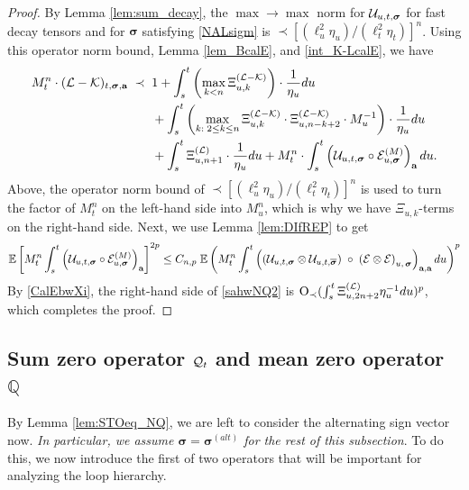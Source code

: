 \begin{proof}
By Lemma \ref{lem:sum_decay}, the $\max\to\max$ norm for ${\cal U}_{u,t,\boldsymbol{\sigma}}$ for fast decay tensors and for $\boldsymbol{\sigma}$ satisfying \eqref{NALsigm} is $\prec[(\ell_{u}^{2}\eta_{u})/(\ell_{t}^{2}\eta_{t})]^{n}$. Using this operator norm bound, Lemma \ref{lem_BcalE}, and \eqref{int_K-LcalE}, we have 
\begin{align}\label{sahwNQ}
M_{t}^n\cdot      (\mathcal{L} - \mathcal{K})_{t, \boldsymbol{\sigma}, \textbf{a}} \;\prec\; \; &
  1+   \int_{s}^t  \left( \max_{k<n }\Xi^{({\cal L-\cal K})}_{u,k}\right) \cdot \frac{1}{\eta_u}   du 
    \nonumber \\
    &+ \int_{s}^t \left( \max_{k:\;2\le k\le n }\Xi^{({\cal L-\cal K})}_{u,k}\cdot \Xi^{({\cal L-\cal K})}_{u,n-k+2}\cdot M_{u}^{-1}\right)\cdot \frac{1}{\eta_u} du 
    \nonumber \\
    &+ \int_{s}^t \Xi^{(\cal L)}_{u,n+1}\cdot \frac1{\eta_u} du 
   +
   M_{t}^n\cdot\int_{s}^t \left(\mathcal{U}_{u, t, \boldsymbol{\sigma}} \circ    \mathcal{E}^{(M)}_{u, \boldsymbol{\sigma}}\right)_{\textbf{a}} du.
\end{align}
 Above, the operator norm bound of $\prec[(\ell_{u}^{2}\eta_{u})/(\ell_{t}^{2}\eta_{t})]^{n}$ is used to turn the factor of $M_{t}^{n}$ on the left-hand side into $M_{u}^{n}$, which is why we have $\Xi_{u,k}$-terms on the right-hand side. Next, we use Lemma \ref{lem:DIfREP} to get
\begin{equation} \label{sahwNQ2}
   \mathbb{E} \left [   M_{t}^{n} \int_{s}^t \left(\mathcal{U}_{u, t, \boldsymbol{\sigma}} \circ \mathcal{E}^{(M)}_{u, \boldsymbol{\sigma}}\right)_{\textbf{a}} \right ]^{2p} 
   \le C_{n,p} \; 
   \mathbb{E}    \left(M_{t}^{n}\int_{s}^t 
   \left(\left(
   \mathcal{U}_{u, t,  \boldsymbol{\sigma}}
   \otimes 
   \mathcal{U}_{u, t,  \overline{\boldsymbol{\sigma}}}
   \right) \;\circ  \;
   \left( \mathcal{E} \otimes  \mathcal{E} \right)
   _{u, \,\boldsymbol{\sigma}  }
   \right)_{{\textbf a}, {\textbf a}}du 
   \right)^{p}
  \end{equation} 
By \eqref{CalEbwXi}, the right-hand side of \eqref{sahwNQ2} is $\mathrm{O}_{\prec}(\int_{s}^{t}\Xi_{u,2n+2}^{({\cal L})}\eta_{u}^{-1}du)^{p}$, which completes the proof.
\end{proof}







 

\subsection{Sum zero operator \texorpdfstring{${\cal Q}_t$}{Qt} {and mean zero operator \texorpdfstring{${\mathbb  Q}$}{Q}}}\label{subsection-sum-zero}
By Lemma \ref{lem:STOeq_NQ}, we are left to consider the alternating sign vector now. \emph{In particular, we assume $\boldsymbol{\sigma}=\boldsymbol{\sigma}^{(alt)}$ for the rest of this subsection}. To do this, we now introduce the first of two operators that will be important for analyzing the loop hierarchy. 

